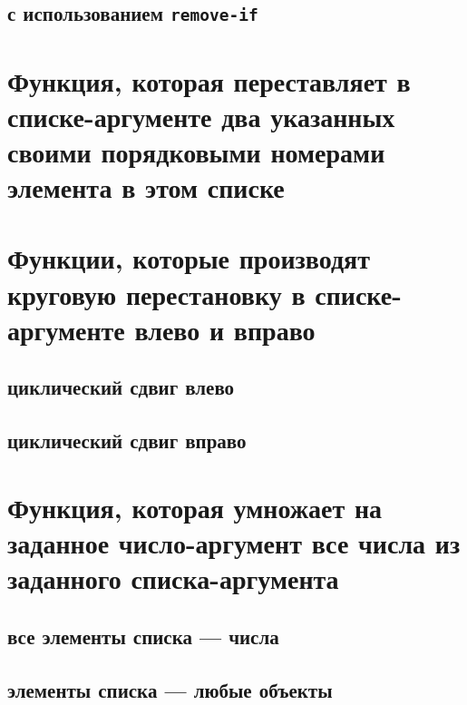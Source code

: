 

\subsection{с использованием \texttt{remove-if}}




\section{Функция, которая переставляет в списке-аргументе два указанных своими порядковыми номерами элемента в этом списке}




\section{Функции, которые производят круговую перестановку в списке-аргументе влево и вправо}

\subsection{циклический сдвиг влево}


\subsection{циклический сдвиг вправо}




\section{Функция, которая умножает на заданное число-аргумент все числа из заданного списка-аргумента}


\subsection{все элементы списка --- числа}


\subsection{элементы списка --- любые объекты}

